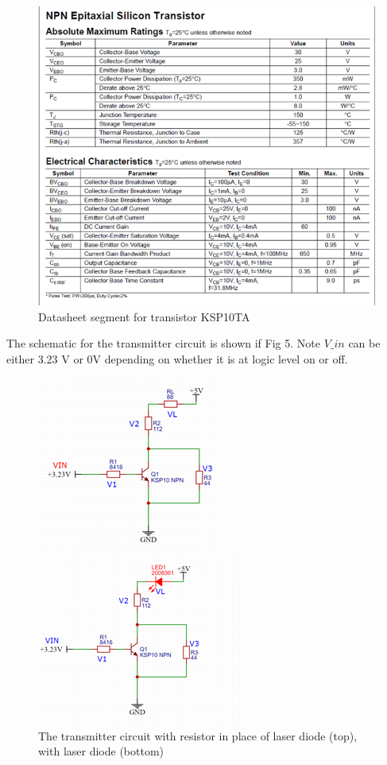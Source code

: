 \documentclass[conference]{IEEEtran}
\begin{document}
\begin{figure}[h!]
\includegraphics[width=\linewidth]{table 1.png}\par
\caption{Datasheet segment for transistor KSP10TA}
\label{fig}
\end{figure}

The schematic for the transmitter circuit is shown if Fig 5. Note $V\_{in}$ can be either 3.23 V or 0V depending on whether it is at logic level on or off.

\begin{figure}[h!]
\includegraphics{fig 4a.png}\par
\includegraphics{fig 4b.png}\par
\caption{The transmitter circuit with resistor in place of laser diode (top), with laser diode (bottom)}
\label{fig}
\end{figure}
\end{document}

